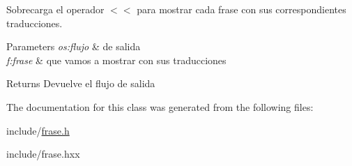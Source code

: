 Sobrecarga el operador $<$$<$ para mostrar cada frase con sus correspondientes traducciones. 


\begin{DoxyParams}{Parameters}
{\em os\+:flujo} & de salida \\
\hline
{\em f\+:frase} & que vamos a mostrar con sus traducciones \\
\hline
\end{DoxyParams}
\begin{DoxyReturn}{Returns}
Devuelve el flujo de salida 
\end{DoxyReturn}


The documentation for this class was generated from the following files\+:\begin{DoxyCompactItemize}
\item 
include/\hyperlink{frase_8h}{frase.\+h}\item 
include/frase.\+hxx\end{DoxyCompactItemize}
